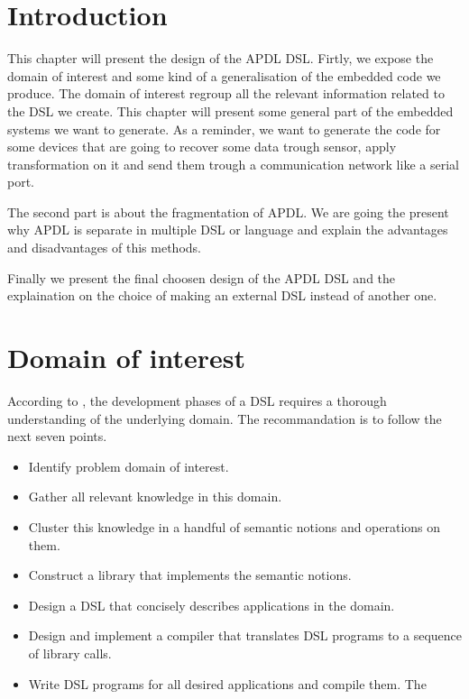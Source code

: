\label{chap:dsl_design}

\section{Introduction}
\label{sec:design_intro}

This chapter will present the design of the \gls{APDL} \gls{DSL}. Firtly, we
expose the domain of interest and some kind of a generalisation of the embedded
code we produce. The domain of interest regroup all the relevant information
related to the \gls{DSL} we create. This chapter will present some general part
of the embedded systems we want to generate. As a reminder, we want to generate
the code for some devices that are going to recover some data trough
sensor, apply transformation on it and send them trough a communication network
like a serial port.

The second part is about the fragmentation of \gls{APDL}. We are going the
present why \gls{APDL} is separate in multiple \gls{DSL} or language and explain
the advantages and disadvantages of this methods.

Finally we present the final choosen design of the \gls{APDL} \gls{DSL} and the
explaination on the choice of making an external \gls{DSL} instead of another
one.

\section{Domain of interest}
\label{sec:design_domain_of_interest}

According to \cite{little_languages_little_maintenance}, the development phases
of a \gls{DSL} requires a thorough understanding of the underlying domain. The
recommandation is to follow the next seven points\cite{little_languages_little_maintenance}.

\begin{itemize}
\item Identify problem domain of interest.
\item Gather all relevant knowledge in this domain.
\item Cluster this knowledge in a handful of semantic notions and operations on them.
\item Construct a library that implements the semantic notions.
\item Design a DSL that concisely describes applications in the domain.
\item Design and implement a compiler that translates DSL programs to a sequence of library calls.
\item Write DSL programs for all desired applications and compile them. The
\end{itemize}

